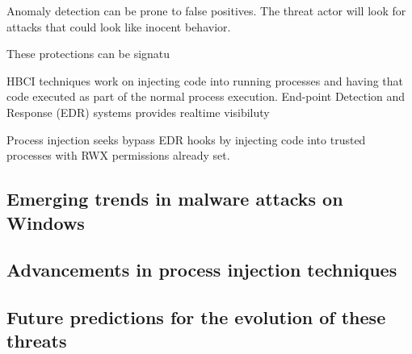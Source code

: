 Anomaly detection can be prone to false positives.  The threat actor will look for attacks that could look like inocent behavior.

These protections can be signatu


HBCI techniques work on injecting code into running processes and having that code executed as part of the normal process
execution.  End-point Detection and Response (EDR) systems \autocite{Hayes:2023} provides realtime visibiluty

Process injection seeks bypass EDR hooks by injecting code into trusted processes with RWX permissions already set.

\subsection{Emerging trends in malware attacks on Windows}

\subsection{Advancements in process injection techniques}

\subsection{Future predictions for the evolution of these threats}


